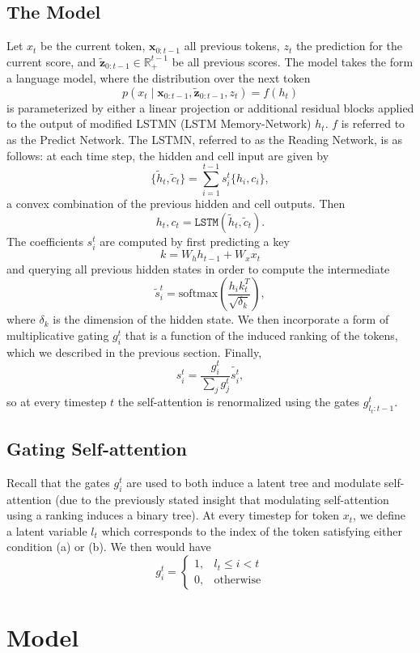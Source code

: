 \documentclass{article}
\newcommand{\bx}{\mathbf{x}}
\newcommand{\bz}{\mathbf{z}}
\newcommand{\R}{\mathbb{R}}
\begin{document}
\subsection{The Model}
Let $x_t$ be the current token, $\bx_{0:t-1}$ all previous tokens, $z_t$ the prediction for the current score,
and $\tilde{\bz}_{0:t-1}\in\R^{t-1}_+$ be all previous scores.
The model takes the form a language model, where
the distribution over the next token
$$p(x_t\mid \bx_{0:t-1}, \tilde{\bz}_{0:t-1},z_t) = f(h_t)$$
is parameterized by either a linear projection or additional residual blocks
applied to the output of modified LSTMN (LSTM Memory-Network) $h_t$.
$f$ is referred to as the Predict Network.
The LSTMN, referred to as the Reading Network, is as follows:
at each time step, the hidden and cell input are given by
$$\{\tilde{h}_t,\tilde{c}_t\} = \sum_{i=1}^{t-1} s_i^t\{h_i,c_i\},$$
a convex combination of the previous hidden and cell outputs.
Then $$h_t,c_t = \texttt{LSTM}(\tilde{h}_t,\tilde{c}_t).$$
The coefficients $s_i^t$ are computed by first predicting a key $$k = W_hh_{t-1}+W_xx_t$$
and querying all previous hidden states in order to compute the intermediate 
$$\tilde{s}_i^t = \textrm{softmax}(\frac{h_ik_t^T}{\sqrt{\delta_k}}),$$
where $\delta_k$ is the dimension of the hidden state.
We then incorporate a form of multiplicative gating $g_i^t$ that is a function of the induced ranking of the tokens,
which we described in the previous section.
Finally,
$$s_i^t = \frac{g_i^t}{\sum_jg_j^t}\tilde{s_i^t},$$
so at every timestep $t$ the self-attention is renormalized using the gates $g_{l_t:t-1}^t$.

\subsection{Gating Self-attention}
Recall that the gates $g_i^t$ are used to both induce a latent tree and modulate self-attention
(due to the previously stated insight that modulating self-attention using a ranking induces a binary tree).
At every timestep for token $x_t$, we define a latent variable $l_t$ which corresponds to the index of the 
token satisfying either condition (a) or (b).
We then would have $$g_i^t = \left\{\begin{array}{lr}
1, & l_t \le i < t\\
0, & \textrm{otherwise}
\end{array}\right.$$



\section{Model}
\end{document}
